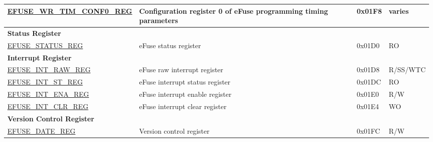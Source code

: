 \begin{longtable}{ | p{6.8cm} | p{7cm} | p{1.3cm} | p{1.2cm} | }
\hyperref[regdesc:EFUSEWRTIMCONF0REG]{EFUSE\_WR\_TIM\_CONF0\_REG} & Configuration register 0 of eFuse programming timing parameters & 0x01F8 & varies \\ \hline
\multicolumn{4}{|l|}{\textbf{Status Register}} \\ \hline
\hyperref[regdesc:EFUSESTATUSREG]{EFUSE\_STATUS\_REG} & eFuse status register & 0x01D0 & RO \\ \hline
\multicolumn{4}{|l|}{\textbf{Interrupt Register}} \\ \hline
\hyperref[regdesc:EFUSEINTRAWREG]{EFUSE\_INT\_RAW\_REG} & eFuse raw interrupt register & 0x01D8 & R/SS/WTC \\ \hline
\hyperref[regdesc:EFUSEINTSTREG]{EFUSE\_INT\_ST\_REG} & eFuse interrupt status register & 0x01DC & RO \\ \hline
\hyperref[regdesc:EFUSEINTENAREG]{EFUSE\_INT\_ENA\_REG} & eFuse interrupt enable register & 0x01E0 & R/W \\ \hline
\hyperref[regdesc:EFUSEINTCLRREG]{EFUSE\_INT\_CLR\_REG} & eFuse interrupt clear register & 0x01E4 & WO \\ \hline
\multicolumn{4}{|l|}{\textbf{Version Control Register}} \\ \hline
\hyperref[regdesc:EFUSEDATEREG]{EFUSE\_DATE\_REG} & Version control register & 0x01FC & R/W \\ \hline
\end{longtable}
